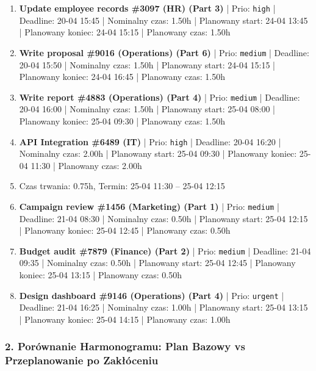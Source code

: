 {\begin{enumerate}
  \item [\textbf{14621}] \textbf{Update employee records \#3097 (HR) (Part 3)} | Prio: \texttt{high} | Deadline: 20-04 15:45 | Nominalny czas: 1.50h | Planowany start: 24-04 13:45 | Planowany koniec: 24-04 15:15 | Planowany czas: 1.50h
  \item [\textbf{14662}] \textbf{Write proposal \#9016 (Operations) (Part 6)} | Prio: \texttt{medium} | Deadline: 20-04 15:50 | Nominalny czas: 1.50h | Planowany start: 24-04 15:15 | Planowany koniec: 24-04 16:45 | Planowany czas: 1.50h
  \item [\textbf{14651}] \textbf{Write report \#4883 (Operations) (Part 4)} | Prio: \texttt{medium} | Deadline: 20-04 16:00 | Nominalny czas: 1.50h | Planowany start: 25-04 08:00 | Planowany koniec: 25-04 09:30 | Planowany czas: 1.50h
  \item [\textbf{14620}] \textbf{API Integration \#6489 (IT)} | Prio: \texttt{high} | Deadline: 20-04 16:20 | Nominalny czas: 2.00h | Planowany start: 25-04 09:30 | Planowany koniec: 25-04 11:30 | Planowany czas: 2.00h
  \item [\textbf{PRZERWA}] Czas trwania: 0.75h, Termin: 25-04 11:30 -- 25-04 12:15
  \item [\textbf{14653}] \textbf{Campaign review \#1456 (Marketing) (Part 1)} | Prio: \texttt{medium} | Deadline: 21-04 08:30 | Nominalny czas: 0.50h | Planowany start: 25-04 12:15 | Planowany koniec: 25-04 12:45 | Planowany czas: 0.50h
  \item [\textbf{14644}] \textbf{Budget audit \#7879 (Finance) (Part 2)} | Prio: \texttt{medium} | Deadline: 21-04 09:35 | Nominalny czas: 0.50h | Planowany start: 25-04 12:45 | Planowany koniec: 25-04 13:15 | Planowany czas: 0.50h
  \item [\textbf{14606}] \textbf{Design dashboard \#9146 (Operations) (Part 4)} | Prio: \texttt{urgent} | Deadline: 21-04 16:25 | Nominalny czas: 1.00h | Planowany start: 25-04 13:15 | Planowany koniec: 25-04 14:15 | Planowany czas: 1.00h
\end{enumerate}
}

\subsubsection*{2. Porównanie Harmonogramu: Plan Bazowy vs Przeplanowanie po Zakłóceniu}

